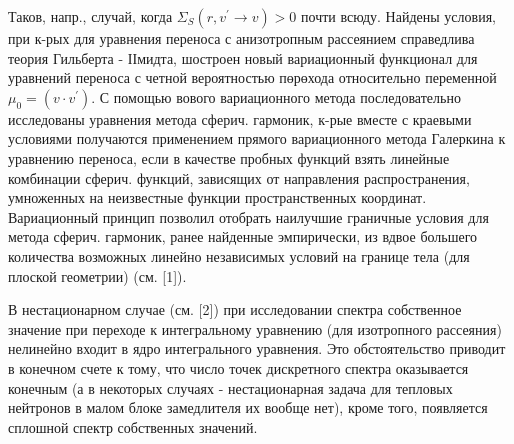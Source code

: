\documentclass[10pt]{article}
\begin{document}
Таков, напр., случай, когда $\Sigma_{S}\left(r, v^{\prime} \rightarrow v\right)>0$ почти всюду. Найдены условия, при к-рых для уравнения переноса с анизотропным рассеянием справедлива теория Гильберта - ІІмидта, шостроен новый вариационный функционал для уравнений переноса с четной вероятностью пөрөхода относительно переменной $\mu_{0}=\left(v \cdot v^{\prime}\right)$. С помощью вового вариационного метода последовательно исследованы уравнения метода сферич. гармоник, к-рые вместе с краевыми условиями получаются применением прямого вариационного метода Галеркина к уравнению переноса, если в качестве пробных функций взять линейные комбинации сферич. функций, зависящих от направления распространения, умноженных на неизвестные функции пространственных координат. Вариационный принцип позволил отобрать наилучшие граничные условия для метода сферич. гармоник, ранее найденные эмпирически, из вдвое большего количества возможных линейно независимых условий на границе тела (для плоской геометрии) (см. [1]).



В нестационарном случае (см. [2]) при исследовании спектра собственное значение при переходе к интегральному уравнению (для изотропного рассеяния) нелинейно входит в ядро интегрального уравнения. Это обстоятельство приводит в конечном счете к тому, что число точек дискретного спектра оказывается конечным (а в некоторых случаях - нестационарная задача для тепловых нейтронов в малом блоке замедлителя их вообще нет), кроме того, появляется сплошной спектр собственных значений.
\end{document}

